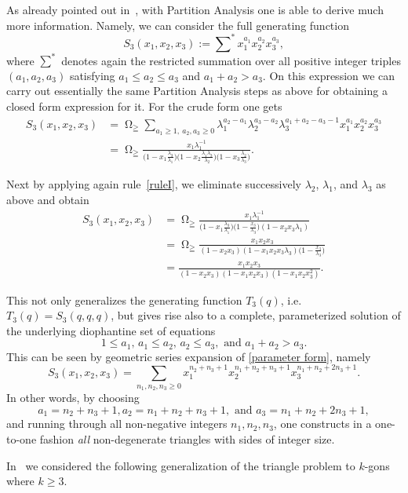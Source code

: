 \documentclass[reqno]{amsart}
\newcommand{\lam}{\lambda}
\DeclareMathOperator*{\Omegaoper}{\Omega}
\newcommand{\Omegaop}{\Omegaoper_{\scriptscriptstyle \geqq}}
\theoremstyle{plain}
\theoremstyle{definition}
\theoremstyle{remark}
\begin{document}
\medskip
As already pointed out in~\cite{Andrews:MMPA2}, with Partition
Analysis one is able to derive much more information. Namely,
we can consider the full generating function
\[
S_3(x_1,x_2,x_3):=
\sum\nolimits^*  x_1^{a_1} x_2^{a_2} x_3^{a_3},
\]
where $\sum^*$ denotes again the restricted summation over
all positive integer triples
$(a_1,a_2,a_3)$ satisfying $a_1 \leq a_2 \leq a_3$
and  $a_1+a_2 > a_3$. On this expression we can
carry out essentially the same Partition Analysis
steps as above for obtaining a closed form expression for it.
For the crude form one gets
\begin{align*}
S_3(x_1,x_2,x_3) & =  \Omegaop \sum_{a_1 \ge 1,~a_2,a_3 \ge 0}
\lam_1^{a_2-a_1} \lam_2^{a_3-a_2} \lam_3^{a_1+a_2-a_3-1}
x_1^{a_1} x_2^{a_2} x_3^{a_3} \\
& = \Omegaop \frac{x_1 \lambda_1^{-1}}
{\big(1- x_1 \frac{\lam_3}{\lam_1} \big)
\big(1-x_2 \frac{\lam_1\lam_3}{\lam_2} \big)
\big(1-x_3 \frac{\lam_2}{\lam_3} \big)}.
\end{align*}

Next by applying again rule~\eqref{ruleI},
we eliminate successively $\lam_2$, $\lam_1$, and $\lam_3$
as above and obtain
\begin{align}
\label{parameter form}
S_3(x_1,x_2,x_3) & = \Omegaop \frac{x_1 \lam_1^{-1}}
{\big(1- x_1 \frac{\lam_3}{\lam_1} \big)
\big(1-\frac{x_3}{\lam_3} \big)
(1-x_2 x_3 \lam_1)} \nonumber \\
& = \Omegaop \frac{x_1 x_2 x_3}{(1- x_2 x_3)
(1- x_1 x_2 x_3 \lam_3)
\big(1-\frac{x_3}{\lam_3} \big)} \nonumber \\
& =  \frac{x_1 x_2 x_3}{(1- x_2 x_3)
(1- x_1 x_2 x_3)
(1- x_1 x_2 x_3^2)}.
\end{align}

This not only generalizes the generating function $T_3(q)$,
i.e.\ $T_3(q)=S_3(q,q,q)$, but gives rise also
to a complete, parameterized solution of the underlying
diophantine set of equations
\[
1 \leq a_1,\, a_1 \leq a_2 ,\, a_2 \leq a_3,
\text{ and } a_1+a_2 > a_3.
\]
This can be seen by geometric series expansion of
\eqref{parameter form}, namely
\[
S_3(x_1,x_2,x_3)=\sum_{n_1,n_2,n_3\ge 0}
x_1^{n_2+n_3+1} x_2^{n_1+n_2+n_3+1} x_3^{n_1+n_2+2 n_3+1}.
\]
In other words, by choosing
\[
a_1 = n_2+n_3+1, a_2 = n_1+n_2+n_3+1,
\text{ and } a_3=n_1+n_2+2 n_3+1,
\]
and running through all non-negative integers $n_1,n_2,n_3$,
one constructs in a one-to-one fashion \textit{all} non-degenerate
triangles with sides of integer size.

\medskip
In~\cite{APR:Omega3} we considered the following generalization
of the triangle problem to $k$-gons where $k \ge 3$.
\end{document}
